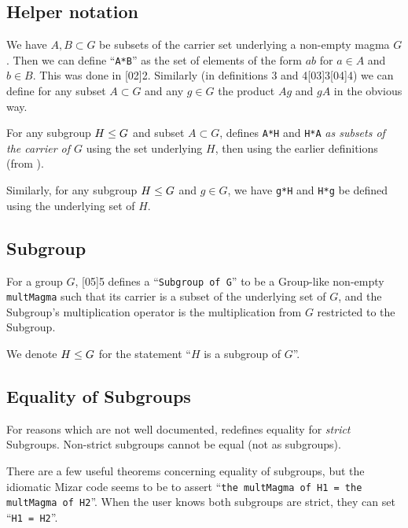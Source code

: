 {\subsection{Helper notation}
We have $A,B\subset G$ be subsets of the carrier set underlying a
non-empty magma $G$. Then we can define ``\verb#A*B#'' as the set of
elements of the form $ab$ for $a\in A$ and $b\in B$. This was done in
[02]{2}. Similarly (in definitions
3 and 4[03]{3}[04]{4}) we can define
for any subset $A\subset G$ and any $g\in G$ the product $Ag$ and $gA$
in the obvious way.

For any subgroup $H\leq G$ and subset $A\subset G$,
 defines \verb$A*H$ and
\verb$H*A$ \emph{as subsets of the carrier of $G$} using the set
underlying $H$, then using the earlier definitions (from
).

Similarly, for any subgroup $H\leq G$ and $g\in G$, we have
\verb#g*H# and \verb#H*g# be defined using the underlying set of $H$.

\subsection{Subgroup}
For a group $G$, [05]{5} defines a
``\verb#Subgroup of G#'' to be a Group-like non-empty \verb#multMagma#
such that its carrier is a subset of the underlying set of $G$, and the
Subgroup's multiplication operator is the multiplication from $G$
restricted to the Subgroup.

\begin{notation}
We denote $H\leq G$ for the statement ``$H$ is a subgroup of $G$''.
\end{notation}

\subsection{Equality of Subgroups}\label{par:introduction:subgroup-equality}
For reasons which are not well documented, 
redefines equality for \emph{strict} Subgroups. Non-strict subgroups
cannot be equal (not as subgroups).

There are a few useful theorems
concerning equality of subgroups, but the idiomatic Mizar code seems to
be to assert ``\texttt{the multMagma of H1 = the multMagma of H2}''.
When the user knows both subgroups are strict, they can set ``\texttt{H1 = H2}''.



}
